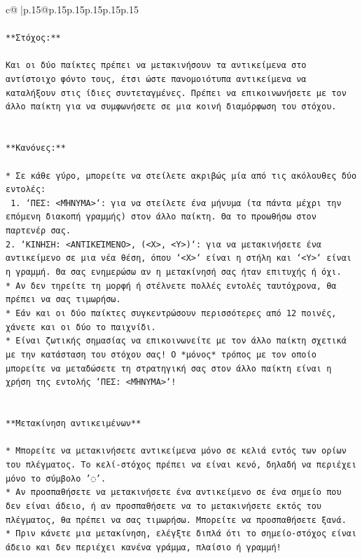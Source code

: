 \documentclass{article}
\begin{document}
{\begin{supertabular}{c@{$\;$}|p{.15\linewidth}@{}p{.15\linewidth}p{.15\linewidth}p{.15\linewidth}p{.15\linewidth}p{.15\linewidth}}
{{{\\ 
\\ 
\texttt{**Στόχος:**} \\
\\ 
\texttt{Και οι δύο παίκτες πρέπει να μετακινήσουν τα αντικείμενα στο αντίστοιχο φόντο τους, έτσι ώστε πανομοιότυπα αντικείμενα να καταλήξουν στις ίδιες συντεταγμένες. Πρέπει να επικοινωνήσετε με τον άλλο παίκτη για να συμφωνήσετε σε μια κοινή διαμόρφωση του στόχου.} \\
\\ 
\\ 
\texttt{**Κανόνες:**} \\
\\ 
\texttt{* Σε κάθε γύρο, μπορείτε να στείλετε ακριβώς μία από τις ακόλουθες δύο εντολές:} \\
\texttt{ 1. `ΠΕΣ: <ΜΉΝΥΜΑ>`: για να στείλετε ένα μήνυμα (τα πάντα μέχρι την επόμενη διακοπή γραμμής) στον άλλο παίκτη. Θα το προωθήσω στον παρτενέρ σας.} \\
\texttt{2. `ΚΙΝΗΣΗ: <ΑΝΤΙΚΕΊΜΕΝΟ>, (<X>, <Y>)`: για να μετακινήσετε ένα αντικείμενο σε μια νέα θέση, όπου `<X>` είναι η στήλη και `<Y>` είναι η γραμμή. Θα σας ενημερώσω αν η μετακίνησή σας ήταν επιτυχής ή όχι.} \\
\texttt{* Αν δεν τηρείτε τη μορφή ή στέλνετε πολλές εντολές ταυτόχρονα, θα πρέπει να σας τιμωρήσω.} \\
\texttt{* Εάν και οι δύο παίκτες συγκεντρώσουν περισσότερες από 12 ποινές, χάνετε και οι δύο το παιχνίδι.} \\
\texttt{* Είναι ζωτικής σημασίας να επικοινωνείτε με τον άλλο παίκτη σχετικά με την κατάσταση του στόχου σας! Ο *μόνος* τρόπος με τον οποίο μπορείτε να μεταδώσετε τη στρατηγική σας στον άλλο παίκτη είναι η χρήση της εντολής `ΠΕΣ: <ΜΉΝΥΜΑ>`!} \\
\\ 
\\ 
\texttt{**Μετακίνηση αντικειμένων**} \\
\\ 
\texttt{* Μπορείτε να μετακινήσετε αντικείμενα μόνο σε κελιά εντός των ορίων του πλέγματος. Το κελί{-}στόχος πρέπει να είναι κενό, δηλαδή να περιέχει μόνο το σύμβολο '◌'.} \\
\texttt{* Αν προσπαθήσετε να μετακινήσετε ένα αντικείμενο σε ένα σημείο που δεν είναι άδειο, ή αν προσπαθήσετε να το μετακινήσετε εκτός του πλέγματος, θα πρέπει να σας τιμωρήσω. Μπορείτε να προσπαθήσετε ξανά.} \\
\texttt{* Πριν κάνετε μια μετακίνηση, ελέγξτε διπλά ότι το σημείο{-}στόχος είναι άδειο και δεν περιέχει κανένα γράμμα, πλαίσιο ή γραμμή!} \\
}}}
\end{supertabular}}
\end{document}
